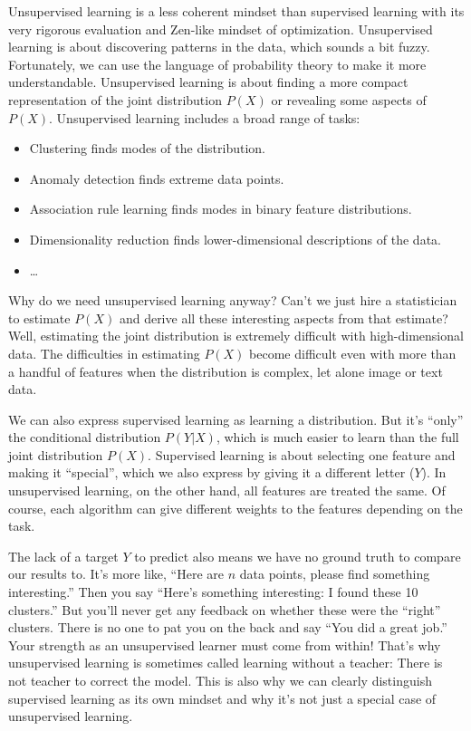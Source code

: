 \documentclass[
  10pt,
]{scrbook}
\providecommand{\tightlist}{%
  \setlength{\itemsep}{0pt}\setlength{\parskip}{0pt}}
\begin{document}
Unsupervised learning is a less coherent mindset than supervised learning with its very rigorous evaluation and Zen-like mindset of optimization.
Unsupervised learning is about discovering patterns in the data, which sounds a bit fuzzy.
Fortunately, we can use the language of probability theory to make it more understandable.
Unsupervised learning is about finding a more compact representation of the joint distribution \(P(X)\) or revealing some aspects of \(P(X)\).
Unsupervised learning includes a broad range of tasks:

\begin{itemize}
\tightlist
\item
  Clustering finds modes of the distribution.
\item
  Anomaly detection finds extreme data points.
\item
  Association rule learning finds modes in binary feature distributions.
\item
  Dimensionality reduction finds lower-dimensional descriptions of the data.
\item
  \ldots{}
\end{itemize}

Why do we need unsupervised learning anyway?
Can't we just hire a statistician to estimate \(P(X)\) and derive all these interesting aspects from that estimate?
Well, estimating the joint distribution is extremely difficult with high-dimensional data.
The difficulties in estimating \(P(X)\) become difficult even with more than a handful of features when the distribution is complex, let alone image or text data.

We can also express supervised learning as learning a distribution.
But it's ``only'' the conditional distribution \(P(Y|X)\), which is much easier to learn than the full joint distribution \(P(X)\).
Supervised learning is about selecting one feature and making it ``special'', which we also express by giving it a different letter (\(Y\)).
In unsupervised learning, on the other hand, all features are treated the same.
Of course, each algorithm can give different weights to the features depending on the task.

The lack of a target \(Y\) to predict also means we have no ground truth to compare our results to.
It's more like, ``Here are \(n\) data points, please find something interesting.''
Then you say ``Here's something interesting: I found these 10 clusters.''
But you'll never get any feedback on whether these were the ``right'' clusters.
There is no one to pat you on the back and say ``You did a great job.''
Your strength as an unsupervised learner must come from within!
That's why unsupervised learning is sometimes called learning without a teacher:
There is not teacher to correct the model.
This is also why we can clearly distinguish supervised learning as its own mindset and why it's not just a special case of unsupervised learning.
\end{document}
